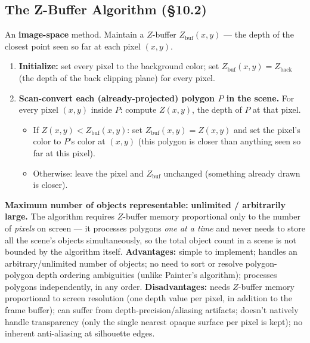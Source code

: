 \documentclass[12pt, a4paper]{article}
\newenvironment{answerbox}{\begin{mdframed}[style=answerframe]}{\end{mdframed}}
\begin{document}
\subsection{The Z-Buffer Algorithm (\S10.2)}
\begin{answerbox}
An \textbf{image-space} method. Maintain a $Z$-buffer $Z_{\mathrm{buf}}(x,y)$ --- the depth of the closest point seen so far at each pixel $(x,y)$.
\begin{enumerate}[noitemsep]
  \item \textbf{Initialize:} set every pixel to the background color; set $Z_{\mathrm{buf}}(x,y) = Z_{\mathrm{back}}$ (the depth of the back clipping plane) for every pixel.
  \item \textbf{Scan-convert each (already-projected) polygon $P$ in the scene.} For every pixel $(x,y)$ inside $P$: compute $Z(x,y)$, the depth of $P$ at that pixel.
  \begin{itemize}[noitemsep]
    \item If $Z(x,y) < Z_{\mathrm{buf}}(x,y)$: set $Z_{\mathrm{buf}}(x,y)=Z(x,y)$ and set the pixel's color to $P$'s color at $(x,y)$ (this polygon is closer than anything seen so far at this pixel).
    \item Otherwise: leave the pixel and $Z_{\mathrm{buf}}$ unchanged (something already drawn is closer).
  \end{itemize}
\end{enumerate}
\textbf{Maximum number of objects representable:} \textbf{unlimited / arbitrarily large.} The algorithm requires $Z$-buffer memory proportional only to the number of \emph{pixels} on screen --- it processes polygons \emph{one at a time} and never needs to store all the scene's objects simultaneously, so the total object count in a scene is not bounded by the algorithm itself.
\textbf{Advantages:} simple to implement; handles an arbitrary/unlimited number of objects; no need to sort or resolve polygon-polygon depth ordering ambiguities (unlike Painter's algorithm); processes polygons independently, in any order.
\textbf{Disadvantages:} needs $Z$-buffer memory proportional to screen resolution (one depth value per pixel, in addition to the frame buffer); can suffer from depth-precision/aliasing artifacts; doesn't natively handle transparency (only the single nearest opaque surface per pixel is kept); no inherent anti-aliasing at silhouette edges.
\end{answerbox}
\end{document}
